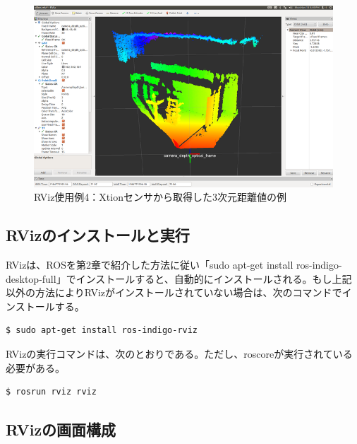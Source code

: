 \begin{figure}[htp]
  \centering
  \includegraphics[width=\columnwidth]{pictures/chapter5/pic_05_04.png}
  \caption{RViz使用例4：Xtionセンサから取得した3次元距離値の例}
\end{figure}

\subsection{RVizのインストールと実行}

RVizは、ROSを第2章で紹介した方法に従い「sudo apt-get install ros-indigo-desktop-full」でインストールすると、自動的にインストールされる。もし上記以外の方法によりRVizがインストールされていない場合は、次のコマンドでインストールする。

\vspace{\baselineskip}
\begin{lstlisting}[language=ROS]
$ sudo apt-get install ros-indigo-rviz
\end{lstlisting}

RVizの実行コマンドは、次のとおりである。ただし、roscoreが実行されている必要がある。

\vspace{\baselineskip}
\begin{lstlisting}[language=ROS]
$ rosrun rviz rviz
\end{lstlisting}

\subsection{RVizの画面構成}

